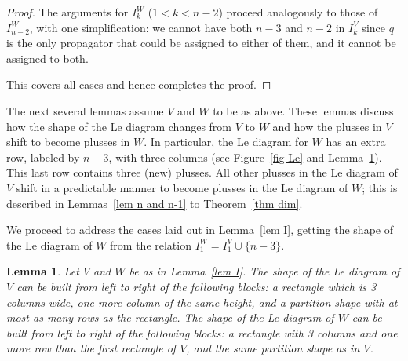 \documentclass[11pt]{article}
\newtheorem{lem}[thm]{Lemma}
\theoremstyle{remark}
\theoremstyle{definition}
\begin{document}
\begin{proof}
The arguments for $I_k^{W}$ ($1< k < n-2$) proceed analogously to those of $I_{n-2}^{W}$, with one simplification: we cannot have both $n-3$ and $n-2$ in $I_k^{V}$ since $q$ is the only propagator that could be assigned to either of them, and it cannot be assigned to both.

This covers all cases and hence completes the proof.
\end{proof}

The next several lemmas assume $V$ and $W$ to be as above. These lemmas discuss how the shape of the Le diagram changes from $V$ to $W$ and how the plusses in $V$ shift to become plusses in $W$. In particular, the Le diagram for $W$ has an extra row, labeled by $n-3$, with three columns (see Figure~\ref{fig Le} and Lemma~\ref{lem shape}). This last row contains three (new) plusses. All other plusses in the Le diagram of $V$ shift in a predictable manner to become plusses in the Le diagram of $W$; this is described in Lemmas~\ref{lem n and n-1} to Theorem~\ref{thm dim}.

We proceed to address the cases laid out in Lemma~\ref{lem I}, getting the shape of the Le diagram of $W$ from the relation $I_1^W= I_1^V \cup \{n-3\}$. 

\begin{lem}\label{lem shape}
  Let $V$ and $W$ be as in Lemma~\ref{lem I}.
  The shape of the Le diagram of $V$ can be built from left to right of the following blocks: a rectangle which is 3 columns wide, one more column of the same height, and a partition shape with at most as many rows as the rectangle.
  The shape of the Le diagram of $W$ can be built from left to right of the following blocks: a rectangle with 3 columns and one more row than the first rectangle of $V$, and the same partition shape as in $V$.
\end{lem}
\end{document}
